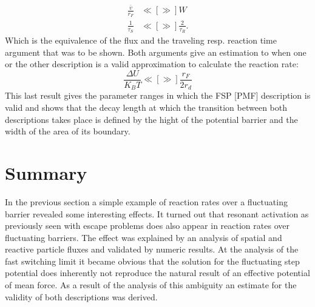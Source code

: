 \begin{align}
    \frac{\bar{v}}{r_F} & \ll[\gg] W \nonumber \\
    \frac{1}{\tau_S} & \ll[\gg] \frac{2}{\tau_R}.
\end{align}
Which is the equivalence of the flux and the traveling resp. reaction time argument that was to be shown.
Both arguments give an estimation to when one or the other description is a valid approximation to calculate the reaction rate:
\begin{equation}
    \frac{\Delta U}{K_B T} \ll[\gg] \frac{r_F}{2 r_d}
    \label{val_estimate}
\end{equation}
This last result gives the parameter ranges in which the FSP [PMF] description is valid and shows that the decay length at which the transition between both descriptions takes place is defined by the hight of the potential barrier and the width of the area of its boundary.
\section{Summary}
In the previous section a simple example of reaction rates over a fluctuating barrier revealed some interesting effects. It turned out that resonant activation as previously seen with escape problems does also appear in reaction rates over fluctuating barriers. The effect was explained by an analysis of spatial and reactive particle fluxes and validated by numeric results. At the analysis of the fast switching limit it became obvious that the solution for the fluctuating step potential does inherently not reproduce the natural result of an effective potential of mean force. As a result of the analysis of this ambiguity an estimate for the validity of both descriptions was derived.

\newpage
